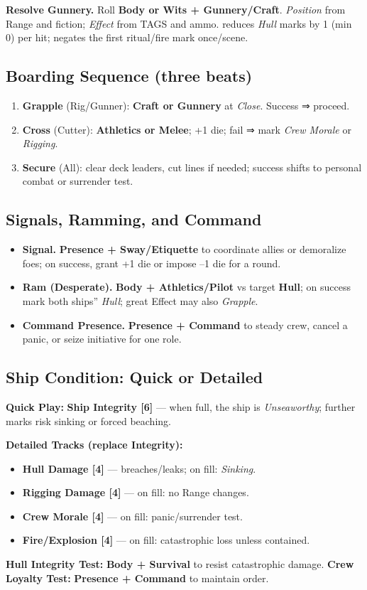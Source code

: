 \documentclass[11pt,oneside]{book}
\newcommand{\tagpill}[1]{\begingroup
  \setlength{\fboxsep}{1pt}\color{black}\fbox{\footnotesize\textsf{#1}}
\endgroup}
\begin{document}
\noindent \textbf{Resolve Gunnery.} Roll \textbf{Body or Wits + Gunnery/Craft}. \emph{Position} from Range and fiction; \emph{Effect} from TAGS and ammo. \tagpill{ARMORED} reduces \textit{Hull} marks by 1 (min 0) per hit; \tagpill{SPIRIT-WARD} negates the first ritual/fire mark once/scene.

\subsection*{Boarding Sequence (three beats)}
\begin{enumerate}[leftmargin=*,itemsep=2pt]
  \item \textbf{Grapple} (Rig/Gunner): \textbf{Craft or Gunnery} at \emph{Close}. Success ⇒ proceed.
  \item \textbf{Cross} (Cutter): \textbf{Athletics or Melee}; \tagpill{BOARDING NETS} +1 die; fail ⇒ mark \textit{Crew Morale} or \textit{Rigging}.
  \item \textbf{Secure} (All): clear deck leaders, cut lines if needed; success shifts to personal combat or surrender test.
\end{enumerate}

\subsection*{Signals, Ramming, and Command}
\begin{itemize}
  \item \textbf{Signal.} \textbf{Presence + Sway/Etiquette} to coordinate allies or demoralize foes; on success, grant +1 die or impose --1 die for a round.
  \item \textbf{Ram (Desperate).} \textbf{Body + Athletics/Pilot} vs target \textbf{Hull}; on success mark both ships'' \textit{Hull}; great Effect may also \textit{Grapple}.
  \item \textbf{Command Presence.} \textbf{Presence + Command} to steady crew, cancel a panic, or seize initiative for one role.
\end{itemize}

\subsection*{Ship Condition: Quick or Detailed}
\textbf{Quick Play:} \textbf{Ship Integrity [6]} --- when full, the ship is \emph{Unseaworthy}; further marks risk sinking or forced beaching.

\medskip
\textbf{Detailed Tracks (replace Integrity):}
\begin{itemize}
  \item \textbf{Hull Damage [4]} --- breaches/leaks; on fill: \emph{Sinking}.
  \item \textbf{Rigging Damage [4]} --- on fill: no Range changes.
  \item \textbf{Crew Morale [4]} --- on fill: panic/surrender test.
  \item \textbf{Fire/Explosion [4]} --- on fill: catastrophic loss unless contained.
\end{itemize}
\noindent \textbf{Hull Integrity Test:} \textbf{Body + Survival} to resist catastrophic damage. \textbf{Crew Loyalty Test:} \textbf{Presence + Command} to maintain order.
\end{document}
